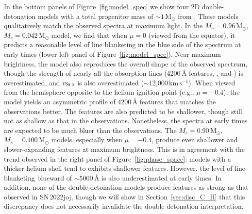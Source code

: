 \documentclass[twocolumn]{aastex631}
\newcommand{\sn}{SN\,2022joj}
\newcommand{\kms}{$\mathrm{km}\,\mathrm{s}^{-1}$}
\begin{document}
\begin{CJK*}{UTF8}{gbsn}
In the bottom panels of Figure~\ref{fig:model_spec} we show four 2D double-detonation models with a total progenitor mass of $\sim$$1\,\mathrm{M_\odot}$ from \citet{Shen_2D_2021}. These models qualitatively match the observed spectra at maximum light. In the $M_c=0.96\,\mathrm{M_\odot}$, $M_s=0.042\,\mathrm{M_\odot}$ model, we find that when $\mu=0$ (viewed from the equator), it predicts a reasonable level of line blanketing in the blue side of the spectrum at early times (lower left panel of Figure~\ref{fig:model_spec}). Near maximum brightness, the model also reproduces the overall shape of the observed spectrum, though the strength of nearly all the absorption lines (4200\,\r{A} features, , and ) is overestimated, and $v_\mathrm{Si\,\textsc{ii}}$ is also overestimated ($\sim$12,000\,\kms). When viewed from the hemisphere opposite to the helium ignition point (e.g., $\mu=-0.4$), the model yields an asymmetric profile of 4200\,\r{A} features that matches the observations better. The  features are also predicted to be shallower, though still not as shallow as that in the observations. Nonetheless, the spectra at early times are expected to be much bluer than the observations. The $M_c=0.90\,\mathrm{M_\odot}$, $M_s=0.100\,\mathrm{M_\odot}$ models, especially when $\mu=-0.4$, produce even shallower and slower-expanding  features at maximum brightness. This is in agreement with the trend observed in the right panel of Figure~\ref{fig:phase_space}: models with a thicker helium shell tend to exhibits shallower  features. However, the level of line-blanketing blueward of $\sim$5000\,\r{A} is also underestimated at early times. In addition, none of the double-detonation models produce  features as strong as that observed in \sn, though we will show in Section~\ref{sec:disc_C_II} that this discrepancy does not necessarily invalidate the double-detonation interpretation.


\end{CJK*}
\end{document}
